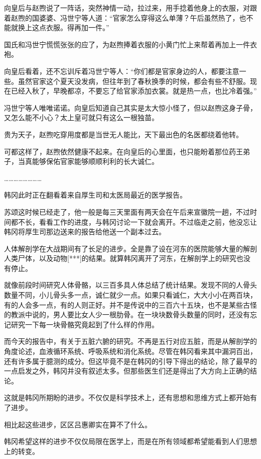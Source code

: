 向皇后与赵煦说了一阵话，突然神情一动，拉过来，用手捻着他身上的衣服，对跟着赵煦的国婆婆、冯世宁等人道：“官家怎么穿得这么单薄？午后虽然热了，也不能就换上这点衣服。得再加一件。”

国氏和冯世宁慌慌张张的应了，为赵煦捧着衣服的小黄门忙上来帮着再加上一件衣袍。

向皇后看着，还不忘训斥着冯世宁等人：“你们都是官家身边的人，都要注意一些。虽然官家这个夏天没发病，但往年到了春秋换季的时候，都会有些不舒服。现在已经入秋了，早晚都凉，不要忘了给官家添加衣裳。就是热一点，也比冷着强。”

冯世宁等人唯唯诺诺。向皇后知道自己其实是太大惊小怪了，但以赵煦这身子骨，又怎么能不小心？太上皇可就只有这么一根独苗。

贵为天子，赵煦吃穿用度都是当世无人能比，天下最出色的名医都绕着他转。

可都这样了，赵煦依然健康不起来。在向皇后的心里面，也只能盼着那位药王弟子，当真能够保佑官家能够顺顺利利的长大诚仁。

……………………

韩冈此时正在翻看着来自厚生司和太医局最近的医学报告。

苏颂这时候已经走了，他一般是每三天里面有两天会在午后来宣徽院一趟，不过时间都不长，看看工作的进度，与韩冈讨论一下就会离开。不过临走之前，他没忘让韩冈将厚生司那边送来的报告给他送一个副本过去。

人体解剖学在大战期间有了长足的进步。全是靠了设在河东的医院能够大量的解剖人类尸体，以及动物[***]的结果。就算韩冈离开了河东，在解剖学上的研究也没有停止。

就像前段时间研究人体骨骼，以三百多具人体总结了统计结果。发现不同的人骨头数量不同，小儿骨头多一点，诚仁就少一点。如果只看诚仁，大大小小在两百块，有的人会多一点，有的人则正好。并不是传说中的三百六十五块，也不是某些古怪的教派中说的，男人要比女人少一根肋骨。在一块块数骨头数量的同时，还没有忘记研究一下每一块骨骼究竟起到了什么样的作用。

而今天的报告中，有关于五脏六腑的研究。不再是五行对应五脏，而是从解剖学的角度论述，血液循环系统、呼吸系统和消化系统。尽管在韩冈看来其中漏洞百出，还有许多属于臆测的成分。但这毕竟不是在韩冈的引导下得出的结论，除了最早的一点启发之外，韩冈并没有叙述太多。但那些医生们还是得出了大方向上正确的结论。

这就是韩冈所期盼的进步。不仅仅是科学技术上，还有思想和思维方式上都开始有了进步。

相比起这些进步，区区吕惠卿实在算不了什么。

韩冈希望这样的进步不仅仅局限在医学上，而是在所有领域都希望能看到人们思想上的转变。

